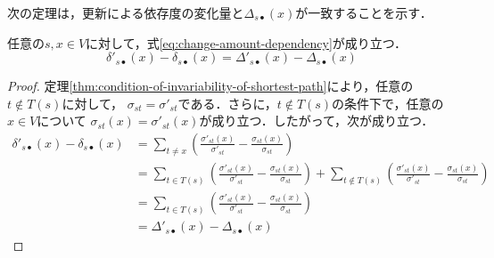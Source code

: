 次の定理は，更新による依存度の変化量と$\Delta_{s\bullet}(x)$が一致することを示す．
\begin{theorem}
  任意の$s,x\in V$に対して，式\eqref{eq:change-amount-dependency}が成り立つ．
  \begin{equation}
    \delta'_{s\bullet}(x)-\delta_{s\bullet}(x)=\Delta'_{s\bullet}(x)-\Delta_{s\bullet}(x)
    \label{eq:change-amount-dependency}
  \end{equation}
\end{theorem}
\begin{proof}
  定理\ref{thm:condition-of-invariability-of-shortest-path}により，任意の$t\notin T(s)$に対して，
  $\sigma_{st}=\sigma'_{st}$である．さらに，$t\notin T(s)$の条件下で，任意の$x\in V$について
  $\sigma_{st}(x)=\sigma'_{st}(x)$が成り立つ．したがって，次が成り立つ．
  \begin{equation*}
    \begin{aligned}
      \delta'_{s\bullet}(x)-\delta_{s\bullet}(x)
      &=\sum_{t\neq x}\left(\frac{\sigma'_{st}(x)}{\sigma'_{st}}-\frac{\sigma_{st}(x)}{\sigma_{st}}\right) \\
      &=\sum_{t\in T(s)}\left(\frac{\sigma'_{st}(x)}{\sigma'_{st}}-\frac{\sigma_{st}(x)}{\sigma_{st}}\right)
      +\sum_{t\notin T(s)}\left(\frac{\sigma'_{st}(x)}{\sigma'_{st}}-\frac{\sigma_{st}(x)}{\sigma_{st}}\right) \\
      &=\sum_{t\in T(s)}\left(\frac{\sigma'_{st}(x)}{\sigma'_{st}}-\frac{\sigma_{st}(x)}{\sigma_{st}}\right) \\
      &=\Delta'_{s\bullet}(x)-\Delta_{s\bullet}(x)
    \end{aligned}
  \end{equation*}
\end{proof}

